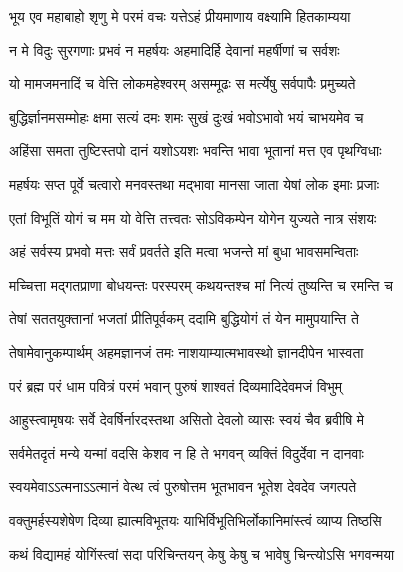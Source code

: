 \twolineshloka
{भूय एव महाबाहो शृणु मे परमं वचः}
{यत्तेऽहं प्रीयमाणाय वक्ष्यामि हितकाम्यया}%

\twolineshloka
{न मे विदुः सुरगणाः प्रभवं न महर्षयः}
{अहमादिर्हि देवानां महर्षीणां च सर्वशः}%

\twolineshloka
{यो मामजमनादिं च वेत्ति लोकमहेश्वरम्}
{असम्मूढः स मर्त्येषु सर्वपापैः प्रमुच्यते}%

\twolineshloka
{बुद्धिर्ज्ञानमसम्मोहः क्षमा सत्यं दमः शमः}
{सुखं दुःखं भवोऽभावो भयं चाभयमेव च}%

\twolineshloka
{अहिंसा समता तुष्टिस्तपो दानं यशोऽयशः}
{भवन्ति भावा भूतानां मत्त एव पृथग्विधाः}%

\twolineshloka
{महर्षयः सप्त पूर्वे चत्वारो मनवस्तथा}
{मद्भावा मानसा जाता येषां लोक इमाः प्रजाः}%

\twolineshloka
{एतां विभूतिं योगं च मम यो वेत्ति तत्त्वतः}
{सोऽविकम्पेन योगेन युज्यते नात्र संशयः}%

\twolineshloka
{अहं सर्वस्य प्रभवो मत्तः सर्वं प्रवर्तते}
{इति मत्वा भजन्ते मां बुधा भावसमन्विताः}%

\twolineshloka
{मच्चित्ता मद्गतप्राणा बोधयन्तः परस्परम्}
{कथयन्तश्च मां नित्यं तुष्यन्ति च रमन्ति च}%

\twolineshloka
{तेषां सततयुक्तानां भजतां प्रीतिपूर्वकम्}
{ददामि बुद्धियोगं तं येन मामुपयान्ति ते}%

\twolineshloka
{तेषामेवानुकम्पार्थम् अहमज्ञानजं तमः}
{नाशयाम्यात्मभावस्थो ज्ञानदीपेन भास्वता}%

\twolineshloka
{परं ब्रह्म परं धाम पवित्रं परमं भवान्}
{पुरुषं शाश्वतं दिव्यमादिदेवमजं विभुम्}%

\twolineshloka
{आहुस्त्वामृषयः सर्वे देवर्षिर्नारदस्तथा}
{असितो देवलो व्यासः स्वयं चैव ब्रवीषि मे}%

\twolineshloka
{सर्वमेतदृतं मन्ये यन्मां वदसि केशव}
{न हि ते भगवन् व्यक्तिं विदुर्देवा न दानवाः}%

\twolineshloka
{स्वयमेवाऽऽत्मनाऽऽत्मानं वेत्थ त्वं पुरुषोत्तम}
{भूतभावन भूतेश देवदेव जगत्पते}%

\twolineshloka
{वक्तुमर्हस्यशेषेण दिव्या ह्यात्मविभूतयः}
{याभिर्विभूतिभिर्लोकानिमांस्त्वं व्याप्य तिष्ठसि}%

\twolineshloka
{कथं विद्यामहं योगिंस्त्वां सदा परिचिन्तयन्}
{केषु केषु च भावेषु चिन्त्योऽसि भगवन्मया}%

